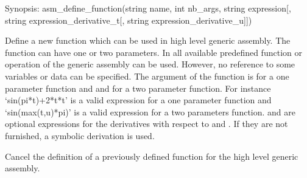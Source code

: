 \documentclass[a4paper,11pt,english]{sphinxmanual}
\begin{document}

\begin{fulllineitems}
\label{\detokenize{python/cmdref_Module asm:getfem.asm_define_function}}
Synopsis: asm\_define\_function(string name, int nb\_args, string expression{[}, string expression\_derivative\_t{[}, string expression\_derivative\_u{]}{]})

Define a new function  which can be used in high level
generic assembly. The function can have one or two parameters.
In  all available predefined function or operation
of the generic assembly can be used. However, no reference to
some variables or data can be specified. The argument of the
function is  for a one parameter function and  and 
for a two parameter function. For instance ‘sin(pi*t)+2*t*t’
is a valid expression for a one parameter function and
‘sin(max(t,u)*pi)’ is a valid expression for a two parameters
function.  and 
are optional expressions for the derivatives with respect
to  and . If they are not furnished, a symbolic derivation
is used.

\end{fulllineitems}


\begin{fulllineitems}
\label{\detokenize{python/cmdref_Module asm:getfem.asm_undefine_function}}
Cancel the definition of a previously defined function 
for the high level generic assembly.

\end{fulllineitems}

\end{document}
